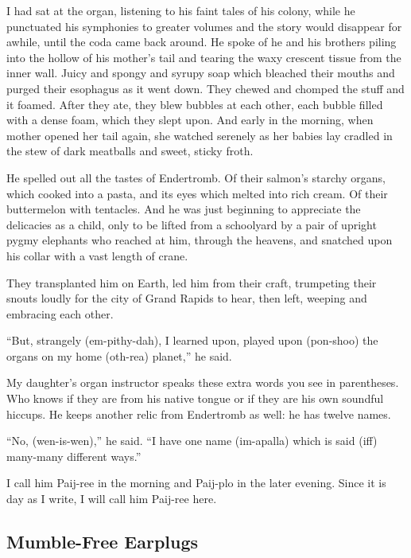 \documentclass[10pt,twoside]{report}
\begin{document}
I had sat at the organ, listening to his faint tales of his colony,
while he punctuated his symphonies to greater volumes and the story
would disappear for awhile, until the coda came back around. He spoke
of he and his brothers piling into the hollow of his mother's tail and
tearing the waxy crescent tissue from the inner wall.  Juicy and
spongy and syrupy soap which bleached their mouths and purged their
esophagus as it went down.  They chewed and chomped the stuff and it
foamed.  After they ate, they blew bubbles at each other, each bubble
filled with a dense foam, which they slept upon.  And early in the
morning, when mother opened her tail again, she watched serenely as
her babies lay cradled in the stew of dark meatballs and sweet, sticky
froth.

He spelled out all the tastes of Endertromb.  Of their salmon's
starchy organs, which cooked into a pasta, and its eyes which melted
into rich cream.  Of their buttermelon with tentacles. And he was just
beginning to appreciate the delicacies as a child, only to be lifted
from a schoolyard by a pair of upright pygmy elephants who reached at
him, through the heavens, and snatched upon his collar with a vast
length of crane.

They transplanted him on Earth, led him from their craft, trumpeting
their snouts loudly for the city of Grand Rapids to hear, then left,
weeping and embracing each other.

``But, strangely (em-pithy-dah), I learned upon, played upon
(pon-shoo) the organs on my home (oth-rea) planet,'' he said.

My daughter's organ instructor speaks these extra words you see in
parentheses.  Who knows if they are from his native tongue or if they
are his own soundful hiccups.  He keeps another relic from Endertromb
as well: he has twelve names.

``No, (wen-is-wen),'' he said.  ``I have one name (im-apalla) which is
said (iff) many-many different ways.''

I call him Paij-ree in the morning and Paij-plo in the later
evening. Since it is day as I write, I will call him Paij-ree here.



\subsection{Mumble-Free Earplugs}



\end{document}
